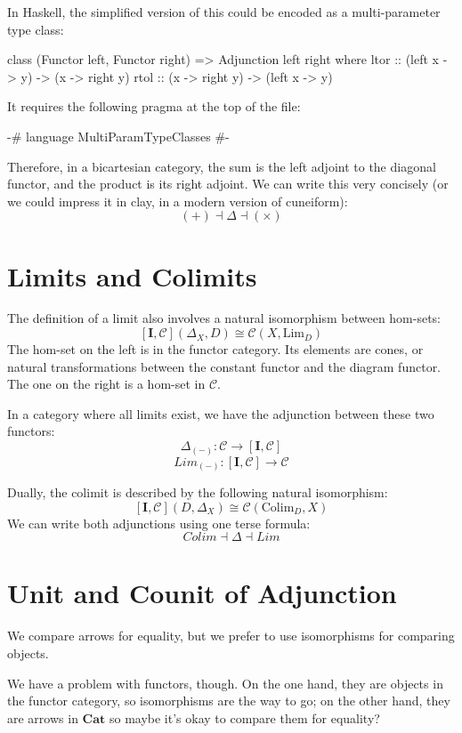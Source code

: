 \documentclass[DaoFP]{subfiles}
\begin{document}
In Haskell, the simplified version of this could be encoded as a multi-parameter type class:
\begin{haskell}
class (Functor left, Functor right) => Adjunction left right where
  ltor :: (left x -> y) -> (x -> right y)
  rtol :: (x -> right y) -> (left x -> y)
\end{haskell}
It requires the following pragma at the top of the file:
\begin{haskell}
{-# language MultiParamTypeClasses #-}
\end{haskell}



Therefore, in a bicartesian category, the sum is the left adjoint to the diagonal functor, and the product is its right adjoint. We can write this very concisely (or we could impress it in clay, in a modern version of cuneiform):
\[ (+) \dashv \Delta \dashv (\times) \]


\section{Limits and Colimits}

The definition of a limit also involves a natural isomorphism between hom-sets:
\[ [\mathbf{I}, \mathcal{C}](\Delta_X, D)  \cong \mathcal{C}(X, \text{Lim}_D) \]
The hom-set on the left is in the functor category. Its elements are cones, or natural transformations between the constant functor and the diagram functor. The one on the right is a hom-set in $\mathcal{C}$. 

In a category where all limits exist, we have the adjunction between these two functors:
\[ \Delta_{(-)} \colon \mathcal{C} \to  [\mathbf{I}, \mathcal{C}] \]
\[ Lim_{(-)} \colon  [\mathbf{I}, \mathcal{C}] \to \mathcal{C} \]

Dually, the colimit is described by the following natural isomorphism:
\[ [\mathbf{I}, \mathcal{C}](D, \Delta_X)  \cong \mathcal{C}( \text{Colim}_D, X) \]
We can write both adjunctions using one terse formula:
\[ Colim \dashv \Delta \dashv Lim\]

\section{Unit and Counit of Adjunction}

We compare arrows for equality, but we prefer to use isomorphisms for comparing objects. 

We have a problem with functors, though. On the one hand, they are objects in the functor category, so isomorphisms are the way to go; on the other hand, they are arrows in $\mathbf{Cat}$ so maybe it's okay to compare them for equality?
\end{document}
